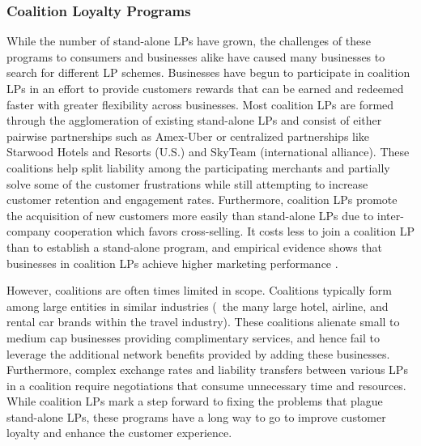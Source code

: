 \subsubsection{Coalition Loyalty Programs}
While the number of stand-alone LPs have grown, the challenges of these programs to consumers and businesses alike have caused many businesses to search for different LP schemes. Businesses have begun to participate in coalition LPs in an effort to provide customers rewards that can be earned and redeemed faster with greater flexibility across businesses. Most coalition LPs are formed through the agglomeration of existing stand-alone LPs and consist of either pairwise partnerships such as Amex-Uber or centralized partnerships like Starwood Hotels and Resorts (U.S.) and SkyTeam (international alliance). These coalitions help split liability among the participating merchants and partially solve some of the customer frustrations while still attempting to increase customer retention and engagement rates. Furthermore, coalition LPs promote the acquisition of new customers more easily than stand-alone LPs due to inter-company cooperation which favors cross-selling. It costs less to join a coalition LP than to establish a stand-alone program, and empirical evidence shows that businesses in coalition LPs achieve higher marketing performance \cite{VR16}. 

However, coalitions are often times limited in scope. Coalitions typically form among large entities in similar industries (\ie\ the many large hotel, airline, and rental car brands within the travel industry). These coalitions alienate small to medium cap businesses providing complimentary services, and hence fail to leverage the additional network benefits provided by adding these businesses. Furthermore, complex exchange rates and liability transfers between various LPs in a coalition require negotiations that consume unnecessary time and resources. While coalition LPs mark a step forward to fixing the problems that plague stand-alone LPs, these programs have a long way to go to improve customer loyalty and enhance the customer experience.

